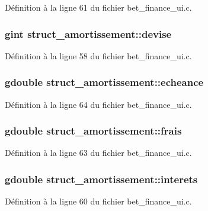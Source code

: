 Définition à la ligne 61 du fichier bet\_\-finance\_\-ui.c.

\subsubsection[{devise}]{\setlength{\rightskip}{0pt plus 5cm}gint {\bf struct\_\-amortissement::devise}}\label{structstruct__amortissement_a2a74284012c6f9dcf97456e362f201cc}


Définition à la ligne 58 du fichier bet\_\-finance\_\-ui.c.

\subsubsection[{echeance}]{\setlength{\rightskip}{0pt plus 5cm}gdouble {\bf struct\_\-amortissement::echeance}}\label{structstruct__amortissement_af9cf274e411cae6fde28e092c580283b}


Définition à la ligne 64 du fichier bet\_\-finance\_\-ui.c.

\subsubsection[{frais}]{\setlength{\rightskip}{0pt plus 5cm}gdouble {\bf struct\_\-amortissement::frais}}\label{structstruct__amortissement_a3d9640ed17ecd637be6f204513196510}


Définition à la ligne 63 du fichier bet\_\-finance\_\-ui.c.

\subsubsection[{interets}]{\setlength{\rightskip}{0pt plus 5cm}gdouble {\bf struct\_\-amortissement::interets}}\label{structstruct__amortissement_ae62911c6a6f51a2ff4e4f9a6f8fbfadd}


Définition à la ligne 60 du fichier bet\_\-finance\_\-ui.c.

